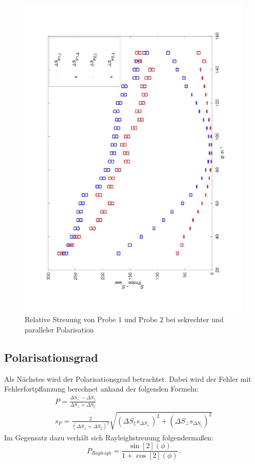 \begin{figure}[ht]
    \captionsetup{justification=centering,margin=2cm}
    \centering
    \includegraphics[width = \linewidth]{Bilder/RelativeStreuung.jpg}
    \caption{Relative Streuung von Probe 1 und Probe 2 bei sekrechter und paralleler Polarisation}
\end{figure}


\subsection*{Polarisationsgrad}

Als Nächstes wird der Polarisationsgrad betrachtet. Dabei wird der Fehler mit Fehlerfortpflanzung berechnet anhand der folgenden Formeln:
\begin{gather}
    P = \frac{\Delta S_{\perp}-\Delta S_{\parallel}}{\Delta S_{\perp} + \Delta S_{\parallel}}\\
    s_P = \frac{2}{(\Delta S_{\perp} + \Delta S_{\parallel})^2}\sqrt{(\Delta S_{\parallel} s_{\Delta S_{\perp}})^2+ (\Delta S_{\perp} s_{\Delta S_{\parallel}})^2}
\end{gather}
Im Gegensatz dazu verhält sich Rayleighstreuung folgendermaßen:
\begin{equation*}
    P_{Rayleigh} = \frac{\sin[2](\phi)}{1+ \cos[2](\phi)}.
\end{equation*}

